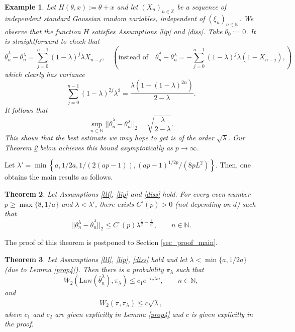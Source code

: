 \documentclass[a4paper]{article}
\newtheorem{theorem}{Theorem}[section]
\newtheorem{example}[theorem]{Example}
\begin{document}
\begin{example} {\rm Let $H(\theta,x):=\theta+x$ and let 
$(X_n)_{n\in\mathbb{Z}}$
		be a sequence of independent standard Gaussian random variables,
		independent of $(\xi_n)_{n\in\mathbb{N}}$. We observe that the function $H$ satisfies Assumptions \ref{lip} and \ref{diss}. Take $\theta_0:=0$.
		It is straightforward to check that \color{red}
		$$
		\overline{\theta}^{\lambda}_n-\theta^{\lambda}_n= \sum_{j=0}^{n-1}
		(1-\lambda)^j \lambda X_{n-j}, \quad( \text{instead of} \quad \overline{\theta}^{\lambda}_n-\theta^{\lambda}_n=- \sum_{j=0}^{n-1}
		(1-\lambda)^j \lambda (1 - X_{n-j}),)
		$$
		which clearly has variance
		$$
		\sum_{j=0}^{n-1}(1-\lambda)^{2j}\lambda^2=\frac{\lambda(1-(1-\lambda)^{2n})}
		{2-\lambda}.
		$$
		It follows that
		$$
		\sup_{n\in\mathbb{N}}||\overline{\theta}^{\lambda}_n-\theta^{\lambda}_n||_2=\sqrt{\frac{\lambda}{2-\lambda}}.
		$$
\color{black}
		This shows that the best estimate we may hope to get is of the
		order $\sqrt{\lambda}$.
		Our Theorem \ref{main} below achieves this bound
		asymptotically as $p\to\infty$.}
\end{example}
 \color{red}
Let $\lambda' = \min\left\{a,1/2a, 1/(2(ap -1)), (ap-1)^{1/2p}/(8pL^2) \right\}$. Then, one obtains the main results as follows.
\color{black}
\begin{theorem}\label{main}
	Let Assumptions \ref{lll}, \ref{lip} and \ref{diss} hold. For every even number \color{red} $p\geq \max\{8,1/a\}$ and $\lambda < \lambda' $, \color{black} there exists $C^{\circ}(p)>0$ (not depending on $d$)
such that \begin{equation} \label{thmrate1}
	||\theta^{\lambda}_n-\overline{\theta}^{\lambda}_n||_2
	\leq C^{\circ}(p)\lambda^{\frac{1}{2} - \frac{3}{2p}}, \qquad n\in\mathbb{N}.
	\end{equation}
\end{theorem}
The proof of this theorem is postponed to Section \ref{sec_proof_main}.

\begin{theorem}\label{thm6}
	Let Assumptions \ref{lll}, \ref{lip}, \ref{diss} hold and let \color{red} $\lambda < \min\{a,1/2a\}$ (due to Lemma \ref{prop4}). \color{black} Then there is a probability $\pi_{\lambda}$ such that
$$
W_2(\mathrm{Law}(\overline{\theta}^{\lambda}_n),\pi_{\lambda})\leq
c_1 e^{-c_2\lambda n},\qquad n\in\mathbb{N},
$$
and
	\begin{align*}
	W_2(\pi,\pi_{\lambda})\leq c\sqrt{\lambda},
	\end{align*}
\color{red}where $c_1$ and $c_2$ are given explicitly in Lemma \ref{prop4} and $c$ is given explicitly in the proof. \color{black} %
\end{theorem}
\end{document}
